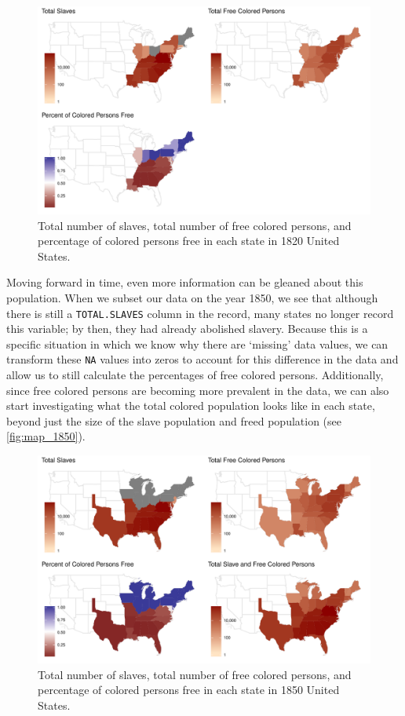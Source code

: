 \documentclass[DIV=calc, paper=a4, fontsize=10pt, twocolumn]{scrartcl}\usepackage[]{graphicx}\usepackage[]{color}
\newenvironment{knitrout}{}{} %
\begin{document}
\begin{knitrout}
\color{fgcolor}\begin{figure}[h]
\includegraphics[width=.5\textwidth]{figure/map_1820-1} \caption[Total number of slaves, total number of free colored persons, and percentage of colored persons free in each state in 1820 United States]{Total number of slaves, total number of free colored persons, and percentage of colored persons free in each state in 1820 United States.}\label{fig:map_1820}
\end{figure}


\end{knitrout}


\par Moving forward in time, even more information can be gleaned about this population. When we subset our data on the year 1850, we see that although there is still a \texttt{TOTAL.SLAVES} column in the record, many states no longer record this variable; by then, they had already abolished slavery. Because this is a specific situation in which we know why there are `missing' data values, we can transform these \texttt{NA} values into zeros to account for this difference in the data and allow us to still calculate the percentages of free colored persons. Additionally, since free colored persons are becoming more prevalent in the data, we can also start investigating what the total colored population looks like in each state, beyond just the size of the slave population and freed population (see \autoref{fig:map_1850}).


\begin{knitrout}
\color{fgcolor}\begin{figure}[h]
\includegraphics[width=.5\textwidth]{figure/map_1850-1} \caption[Total number of slaves, total number of free colored persons, and percentage of colored persons free in each state in 1850 United States]{Total number of slaves, total number of free colored persons, and percentage of colored persons free in each state in 1850 United States.}\label{fig:map_1850}
\end{figure}


\end{knitrout}
\end{document}
